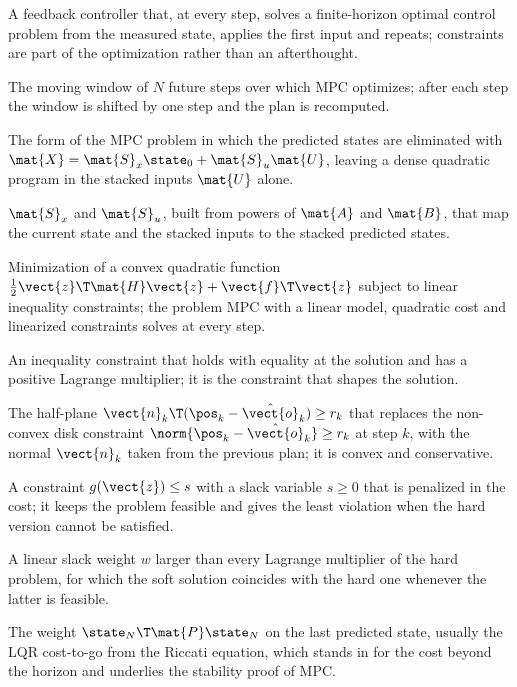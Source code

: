 \item[Model predictive control (MPC)] A feedback controller that, at every step, solves a finite-horizon optimal control problem from the measured state, applies the first input and repeats; constraints are part of the optimization rather than an afterthought.
\item[Receding horizon] The moving window of $N$ future steps over which MPC optimizes; after each step the window is shifted by one step and the plan is recomputed.
\item[Condensed QP] The form of the MPC problem in which the predicted states are eliminated with $\mat{X}=\mat{S}_x\state_0+\mat{S}_u\mat{U}$, leaving a dense quadratic program in the stacked inputs $\mat{U}$ alone.
\item[Prediction matrices] $\mat{S}_x$ and $\mat{S}_u$, built from powers of $\mat{A}$ and $\mat{B}$, that map the current state and the stacked inputs to the stacked predicted states.
\item[Quadratic program (QP)] Minimization of a convex quadratic function $\tfrac12\vect{z}\T\mat{H}\vect{z}+\vect{f}\T\vect{z}$ subject to linear inequality constraints; the problem MPC with a linear model, quadratic cost and linearized constraints solves at every step.
\item[Active constraint] An inequality constraint that holds with equality at the solution and has a positive Lagrange multiplier; it is the constraint that shapes the solution.
\item[Linearized avoidance constraint] The half-plane $\vect{n}_k\T(\pos_k-\hat{\vect{o}}_k)\ge r_k$ that replaces the non-convex disk constraint $\norm{\pos_k-\hat{\vect{o}}_k}\ge r_k$ at step $k$, with the normal $\vect{n}_k$ taken from the previous plan; it is convex and conservative.
\item[Soft constraint] A constraint $g(\vect{z})\le s$ with a slack variable $s\ge0$ that is penalized in the cost; it keeps the problem feasible and gives the least violation when the hard version cannot be satisfied.
\item[Exact penalty] A linear slack weight $w$ larger than every Lagrange multiplier of the hard problem, for which the soft solution coincides with the hard one whenever the latter is feasible.
\item[Terminal cost] The weight $\state_N\T\mat{P}\state_N$ on the last predicted state, usually the LQR cost-to-go from the Riccati equation, which stands in for the cost beyond the horizon and underlies the stability proof of MPC.
